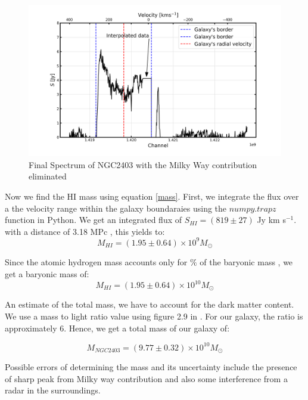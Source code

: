 \documentclass[12pt]{article}
\begin{document}
\begin{figure}[H]
    \centering
    \includegraphics[width = \textwidth]{fig/subsub.png}
    \caption{Final Spectrum of NGC2403 with the Milky Way contribution eliminated}
    \label{fig4.6}
\end{figure}

Now we find the HI mass using equation \ref{mass}. First, we integrate the flux over a the velocity range within the galaxy boundaraies using the $numpy.trapz$ function in Python. We get an integrated flux of $S_{HI} = (819 \pm 27)$ Jy km s$^{-1}$. with a distance of 3.18 MPc \cite{survey}, this yields to:
\begin{equation}
    M_{HI} = (1.95 \pm 0.64) \times 10^{9} M_{\odot}
\end{equation}

Since the atomic hydrogen mass accounts only for $\%$ of the baryonic mass \cite{lecturenote}, we get a baryonic mass of:
\begin{equation}
    M_{HI} = (1.95 \pm 0.64) \times 10^{10} M_{\odot}
\end{equation}

An estimate of the total mass, we have to account for the dark matter content. We use a mass to light ratio value using figure 2.9 in \cite{lecturenote}. For our galaxy, the ratio is approximately 6. Hence, we get a total mass of our galaxy of:

\begin{equation}
    M_{NGC2403} = (9.77 \pm 0.32) \times 10^{10} M_{\odot}
\end{equation}

Possible errors of determining the mass and its uncertainty include the presence of sharp peak from Milky way contribution and also some interference from a radar in the surroundings. 
\end{document}
